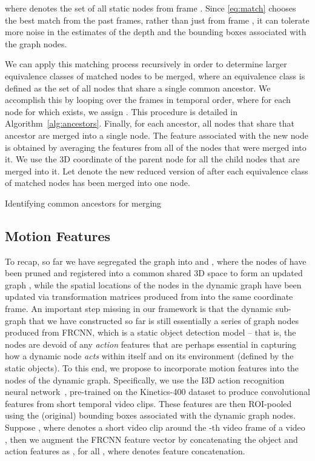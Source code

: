 \documentclass[letterpaper]{article} \usepackage{aaai22}  \usepackage{times}  \usepackage{helvet}  \usepackage{courier}  \usepackage[hyphens]{url}  \usepackage{graphicx} \urlstyle{rm} \def\UrlFont{\rm}  \usepackage{natbib}  \usepackage{caption} \DeclareCaptionStyle{ruled}{labelfont=normalfont,labelsep=colon,strut=off} \frenchspacing  \setlength{\pdfpagewidth}{8.5in}  \setlength{\pdfpageheight}{11in}  \usepackage{algorithm}
\begin{document}
where  denotes the set of all static nodes from frame . Since \eqref{eq:match} chooses the best match from the past  frames, rather than just from frame , it can tolerate more noise in the estimates of the depth and the bounding boxes associated with the graph nodes. 

We can apply this matching process recursively in order to determine larger equivalence classes of matched nodes to be merged, where an equivalence class is defined as the set of all nodes that share a single common ancestor. We accomplish this by looping over the frames  in temporal order, where for each node  for which  exists, we assign 
. This procedure is detailed in Algorithm~\ref{alg:ancestors}. Finally, for each ancestor, all nodes that share that ancestor are merged into a single node. The feature  associated with the new node  is obtained by averaging the features from all of the nodes that were merged into it. We use the 3D coordinate  of the parent node for all the child nodes that are merged into it. Let  denote the new reduced version of  after each equivalence class of matched nodes has been merged into one node.

\begin{algorithm}[tb]
\caption{Identifying common ancestors for merging}
\label{alg:ancestors}
\begin{algorithmic}\FOR{}
\STATE 
\ENDFOR
{}
\FOR{}
\STATE 
\ENDIF
\ENDFOR
\ENDFOR
\end{algorithmic}
\end{algorithm}
\subsection{Motion Features}
To recap, so far we have segregated the graph  into  and , where the nodes of  have been pruned and registered into a common shared 3D space to form an updated graph , while the spatial locations of the nodes in the dynamic graph  have been updated via transformation matrices produced from  into the same coordinate frame. An important step missing in our framework is that the dynamic sub-graph that we have constructed so far is still essentially a series of graph nodes produced from FRCNN, which is a static object detection model -- that is, the nodes are devoid of any \emph{action} features that are perhaps essential in capturing how a dynamic node \emph{acts} within itself and on its environment (defined by the static objects). To this end, we propose to incorporate motion features into the nodes of the dynamic graph. Specifically, we use the I3D action recognition neural network~\cite{carreira2017quo}, pre-trained on the Kinetics-400 dataset to produce convolutional features from short temporal video clips. These features are then ROI-pooled using the (original) bounding boxes associated with the dynamic graph nodes. Suppose , where  denotes a short video clip around the -th video frame of a video , then we augment the FRCNN feature vector by concatenating the object and action features as , for all , where  denotes feature concatenation.
\end{document}
